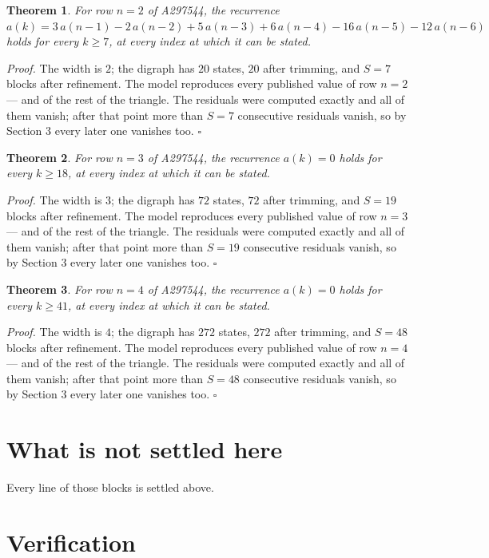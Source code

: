 \documentclass[11pt]{article}
\newtheorem{theorem}{Theorem}
\theoremstyle{definition}
\begin{document}
\begin{theorem} For row $n = 2$ of A297544, the recurrence $a(k) = 3\,a(n-1) - 2\,a(n-2) + 5\,a(n-3) + 6\,a(n-4) - 16\,a(n-5) - 12\,a(n-6)$ holds for every $k \ge 7$, at every index at which it can be stated.\end{theorem}

{\itshape Proof.} The width is $2$; the digraph has $20$ states, $20$ after trimming, and $S = 7$ blocks after refinement. The model reproduces every published value of row $n = 2$ --- and of the rest of the triangle. The residuals were computed exactly and all of them vanish; after that point more than $S = 7$ consecutive residuals vanish, so by Section 3 every later one vanishes too. $\square$

\begin{theorem} For row $n = 3$ of A297544, the recurrence $a(k) = 0$ holds for every $k \ge 18$, at every index at which it can be stated.\end{theorem}

{\itshape Proof.} The width is $3$; the digraph has $72$ states, $72$ after trimming, and $S = 19$ blocks after refinement. The model reproduces every published value of row $n = 3$ --- and of the rest of the triangle. The residuals were computed exactly and all of them vanish; after that point more than $S = 19$ consecutive residuals vanish, so by Section 3 every later one vanishes too. $\square$

\begin{theorem} For row $n = 4$ of A297544, the recurrence $a(k) = 0$ holds for every $k \ge 41$, at every index at which it can be stated.\end{theorem}

{\itshape Proof.} The width is $4$; the digraph has $272$ states, $272$ after trimming, and $S = 48$ blocks after refinement. The model reproduces every published value of row $n = 4$ --- and of the rest of the triangle. The residuals were computed exactly and all of them vanish; after that point more than $S = 48$ consecutive residuals vanish, so by Section 3 every later one vanishes too. $\square$

\section{What is not settled here}

Every line of those blocks is settled above.

\section{Verification}
\end{document}
